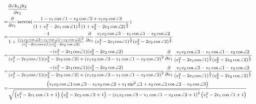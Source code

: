 \begin{equation}
  \footnotesize
  \begin{aligned}
    & \frac{\partial \angle k_1jk_2}{\partial v_1} \\= 
    & \frac{\partial }{\partial v_1}
    \arccos (
      \frac
        {
          1
          -
          v_1 \cos\angle1 
          -
          v_2 \cos\angle2 
          +
          v_1v_2 \cos\angle3 
        }{
          {(1 + v_1^2 - 2v_1 \cos\angle1 )^\frac{1}{2}}
          {(1 + v_2^2 - 2v_2 \cos\angle2 )^\frac{1}{2}}
        } 
    )
  \\
  =
  &\frac{-1}{1+\frac{\left(v_1v_2 \cos\angle3 - v_1 \cos\angle1 - v_2\cos\angle2 \right)^2}{ {(v_1^2-2  v_1 cos\angle1 )} {(v_2^2-2  v_2 \cos\angle2 )}}}
    \frac{\partial }{\partial v_1}
    \frac{v_1v_2 \cos\angle3 - v_1 \cos\angle1 - v_2\cos\angle2 }{ {(v_1^2-2  v_1 cos\angle1 )^\frac{1}{2}} {(v_2^2-2  v_2 \cos\angle2 )^\frac{1}{2}}}
    \\
=
  &\frac
  {-(v_1^2-2  v_1 cos\angle1 )(v_2^2-2  v_2 \cos\angle2 )}
  {(v_1^2-2  v_1 cos\angle1 )(v_2^2-2  v_2 \cos\angle2 )+\left(v_1v_2 \cos\angle3 - v_1 \cos\angle1 - v_2\cos\angle2 \right)^2}
  \frac{\partial }{\partial v_1}
  \frac{v_1v_2 \cos\angle3 - v_1 \cos\angle1 - v_2\cos\angle2 }{ {(v_1^2-2  v_1 cos\angle1 )^\frac{1}{2}} {(v_2^2-2  v_2 \cos\angle2 )^\frac{1}{2}}}
  \\
  =
  &\frac
  {-(v_1^2-2  v_1 cos\angle1 )(v_2^2-2  v_2 \cos\angle2 )}
  {(v_1^2-2  v_1 cos\angle1 )(v_2^2-2  v_2 \cos\angle2 )+\left(v_1v_2 \cos\angle3 - v_1 \cos\angle1 - v_2\cos\angle2 \right)^2}
  \frac{\partial }{\partial v_1}
  \frac{v_1v_2 \cos\angle3 - v_1 \cos\angle1 - v_2\cos\angle2 }{ {(v_1^2-2  v_1 cos\angle1 )^\frac{1}{2}} {(v_2^2-2  v_2 \cos\angle2 )^\frac{1}{2}}}
  \\
=&
  \frac
  {
    \left(
      v_1 v_2 \cos{\angle{1} } \cos{\angle{3} } 
      -
      v_1 v_2 \cos{\angle{2} } 
      + 
      v_1 \sin^{2}{\angle{1} } 
      +
      v_2 \cos{\angle{1} } \cos{\angle{2} } 
      -
      v_2 \cos{\angle{3} }
    \right)
  }
  {
    \sqrt{
\left(v_1^{2} - 2 v_1 \cos{\angle{1} } + 1\right) 
        \left(v_2^{2} - 2 v_2 \cos{\angle{2} } + 1\right) 
        -
        \left(
          v_1 v_2 \cos{\angle{3} } 
          - 
          v_1 \cos{\angle{1} } 
          - 
          v_2 \cos{\angle{2} } 
          + 
          1
        \right)^{2}
}
    \left(v_1^{2} - 2 v_1 \cos{\angle{1} } + 1\right)
}
  \end{aligned}
  \label{eq:k1jk2_d_v1}
\end{equation}





